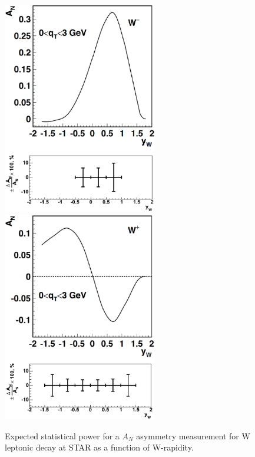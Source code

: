\documentclass[12pt]{article}
\begin{document}
\begin{figure}[tbhp]
\begin{center}
\includegraphics[width=6.75cm]{images/anapow_w_minus.eps}
\includegraphics[width=6.75cm]{images/anapow_w_plus.eps}
\end{center}
\caption{\label{fig:MC_Wmeas_stat} Expected statistical power for a $A_N$ asymmetry measurement for W leptonic decay at STAR as a function of W-rapidity.}
\end{figure}
\end{document}
